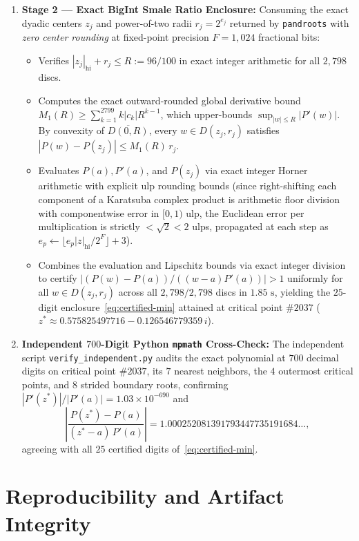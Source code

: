 \documentclass[11pt,a4paper]{amsart}
\theoremstyle{remark}
\begin{document}
\begin{enumerate}
  \item \textbf{Stage 2 --- Exact BigInt Smale Ratio Enclosure:}
  Consuming the exact dyadic centers $z_j$ and power-of-two radii
  $r_j = 2^{e_j}$ returned by \texttt{pandroots} with \emph{zero center
  rounding} at fixed-point precision $F = 1{,}024$ fractional bits:
  \begin{itemize}
    \item Verifies $|z_j|_{\mathrm{hi}} + r_j \le R := 96/100$ in exact integer
    arithmetic for all $2{,}798$ discs.
    \item Computes the exact outward-rounded global derivative bound
    $M_1(R) \ge \sum_{k=1}^{2799} k |c_k| R^{k-1}$, which upper-bounds
    $\sup_{|w| \le R} |P'(w)|$. By convexity of $\overline{D(0, R)}$, every
    $w \in D(z_j, r_j)$ satisfies $|P(w) - P(z_j)| \le M_1(R)\, r_j$.
    \item Evaluates $P(a), P'(a)$, and $P(z_j)$ via exact integer Horner
    arithmetic with explicit ulp rounding bounds (since right-shifting each
    component of a Karatsuba complex product is arithmetic floor division with
    componentwise error in $[0, 1)$ ulp, the Euclidean error per multiplication
    is strictly $< \sqrt{2} < 2$ ulps, propagated at each step as
    $e_p \leftarrow \lfloor e_p |z|_{\mathrm{hi}} / 2^F \rfloor + 3$).
    \item Combines the evaluation and Lipschitz bounds via exact integer
    division to certify $|(P(w) - P(a))/((w - a) P'(a))| > 1$ uniformly for all
    $w \in D(z_j, r_j)$ across all $2{,}798 / 2{,}798$ discs in $1.85\text{ s}$,
    yielding the $25$-digit enclosure~\eqref{eq:certified-min} attained at
    critical point $\#2037$ ($z^* \approx 0.575825497716 - 0.126546779359\,i$).
  \end{itemize}

  \item \textbf{Independent $700$-Digit Python \texttt{mpmath} Cross-Check:}
  The independent script \texttt{verify\_independent.py} audits the exact
  polynomial at $700$ decimal digits on critical point $\#2037$, its $7$ nearest
  neighbors, the $4$ outermost critical points, and $8$ strided boundary roots,
  confirming $|P'(z^*)|/|P'(a)| = 1.03 \times 10^{-690}$ and
  \[
    \left|\frac{P(z^*) - P(a)}{(z^* - a)\, P'(a)}\right|
    = 1.000252081391793447735191684\ldots,
  \]
  agreeing with all $25$ certified digits of~\eqref{eq:certified-min}.
\end{enumerate}

\section{Reproducibility and Artifact Integrity}
\end{document}
